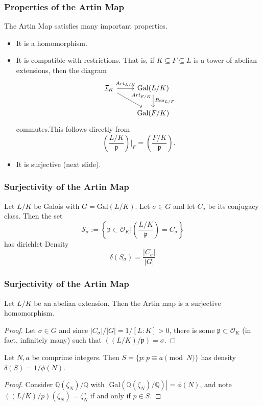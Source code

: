 \documentclass{beamer}
\newcommand{\Gal}{\mathrm{Gal}}
\newcommand{\QQ}{\mathbb{Q}}
\newcommand{\pp}{\mathfrak{p}}
\theoremstyle{plain}
\begin{document}
\begin{frame}[fragile]
    \frametitle{Properties of the Artin Map}
    The Artin Map satisfies many important properties.\pause
    \begin{itemize}
        \item It is a homomorphism.\pause
        \item It is compatible with restrictions. That is, if $K\subseteq F\subseteq L$ is a tower of abelian extensions, then the diagram
        \[
            \begin{tikzcd}
                \mathcal{I}_K \arrow[r,"Art_{L/K}"] \arrow[dr,"Art_{F/K}"] & \Gal(L/K) \arrow[d,"Res_{L/F}"] \\
                 & \Gal(F/K)
            \end{tikzcd}
        \]
        commutes.\pause This follows directly from 
        $$\left(\frac{L/K}{\pp}\right)\bigg|_{F}=\left(\frac{F/K}{\pp}\right).$$\pause
        \item It is surjective (next slide).
    \end{itemize}
\end{frame}

\begin{frame}
    \frametitle{Surjectivity of the Artin Map}
    \begin{theorem} Let $L/K$ be Galois with $G=\Gal(L/K)$. Let $\sigma\in G$ and let $C_\sigma$ be its conjugacy class. \pause Then the set 
    $$\mathcal{S}_\sigma:=\left\{\pp\subset\mathcal{O}_K|\left(\frac{L/K}{\pp}\right)=C_\sigma\right\}$$
    has dirichlet Density
    $$\delta(S_\sigma)=\frac{|C_\sigma|}{|G|}$$
    \end{theorem}
\end{frame}

\begin{frame}
    \frametitle{Surjectivity of the Artin Map}
    \begin{corollary}
        Let $L/K$ be an abelian extension. Then the Artin map is a surjective homomorphism.
    \end{corollary}
    \pause
    \begin{proof}
        Let $\sigma\in G$ and since $|C_\sigma|/|G|=1/[L:K]>0$, there is some $\pp\subset\mathcal{O}_K$ (in fact, infinitely many) such that $((L/K)/\pp)=\sigma$.
    \end{proof}
    \pause
    \begin{corollary}[Dirichlet]
        Let $N,a$ be comprime integers. Then $S=\{p :p\equiv a\pmod{N}\}$ has density $\delta(S)=1/\phi(N)$.
    \end{corollary}
    \pause
    \begin{proof}
        Consider $\QQ(\zeta_N)/\QQ$ with $|\Gal(\QQ(\zeta_N)/\QQ)|=\phi(N)$, and note $((L/K)/p)(\zeta_N)=\zeta_N^a$ if and only if $p\in S$. 
    \end{proof}
\end{frame}
\end{document}
